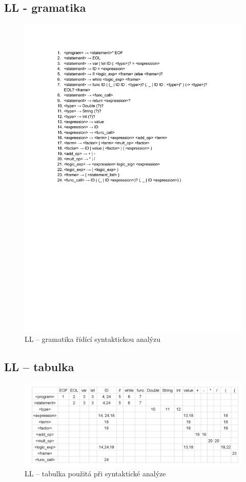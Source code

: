 \documentclass[a4paper, 11pt]{article}
\begin{document}
	\subsection{LL - gramatika}
	\begin{figure}[!ht]
		\centering
		\vspace{-1.2cm}
		\includegraphics[width=0.95\linewidth]{LL_gramatika.pdf}
		\caption{LL -- gramatika řídící syntaktickou analýzu }
		\label{figure:ll_gramatika}
	\end{figure}


	\subsection{LL -- tabulka}
	\begin{figure}[!ht]
		\centering
		\includegraphics[width=1\linewidth]{LL_table.png}
		\caption{LL -- tabulka použitá při syntaktické analýze}
		\label{figure:ll_tabulka}
	\end{figure}
\end{document}

